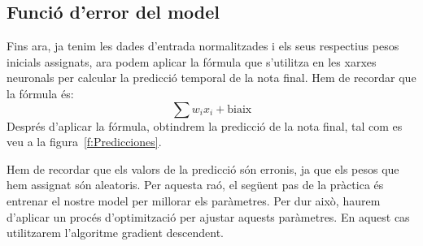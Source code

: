 \subsection{Funció d'error del model}
Fins ara, ja tenim les dades d'entrada normalitzades i els seus respectius pesos inicials assignats, ara podem aplicar la fórmula que s'utilitza en les xarxes neuronals per calcular la predicció temporal de la nota final. Hem de recordar que la fórmula és:
$$\sum w_i x_i + \text{biaix}$$
Després d'aplicar la fórmula, obtindrem la predicció de la nota final, tal com es veu a la figura~\ref{f:Predicciones}.

Hem de recordar que els valors de la predicció són erronis, ja que els pesos que hem assignat són aleatoris. Per aquesta raó, el següent pas de la pràctica és entrenar el nostre model per millorar els paràmetres. Per dur això, haurem d'aplicar un procés d'optimització per ajustar aquests paràmetres. En aquest cas utilitzarem l'algoritme gradient descendent.


